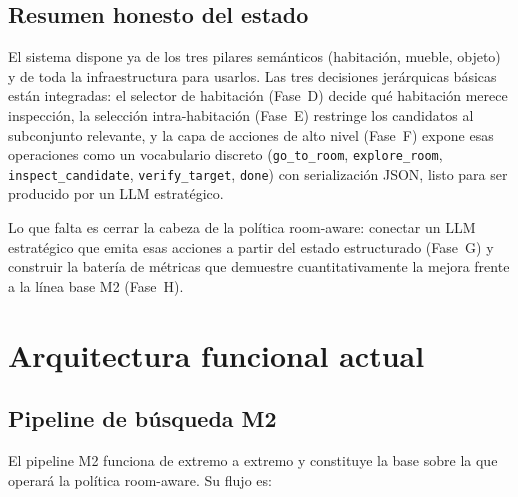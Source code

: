 \documentclass[11pt,a4paper]{article}
\begin{document}
\subsection{Resumen honesto del estado}

El sistema dispone ya de los tres pilares semánticos (habitación, mueble,
objeto) y de toda la infraestructura para usarlos. Las tres decisiones
jerárquicas básicas están integradas: el selector de habitación (Fase~D)
decide qué habitación merece inspección, la selección intra-habitación
(Fase~E) restringe los candidatos al subconjunto relevante, y la capa de
acciones de alto nivel (Fase~F) expone esas operaciones como un vocabulario
discreto (\texttt{go\_to\_room}, \texttt{explore\_room},
\texttt{inspect\_candidate}, \texttt{verify\_target}, \texttt{done}) con
serialización JSON, listo para ser producido por un LLM estratégico.

Lo que falta es cerrar la cabeza de la política room-aware: conectar un LLM
estratégico que emita esas acciones a partir del estado estructurado
(Fase~G) y construir la batería de métricas que demuestre cuantitativamente
la mejora frente a la línea base M2 (Fase~H).

\section{Arquitectura funcional actual}

\subsection{Pipeline de búsqueda M2}

El pipeline M2 funciona de extremo a extremo y constituye la base sobre la
que operará la política room-aware. Su flujo es:
\end{document}
